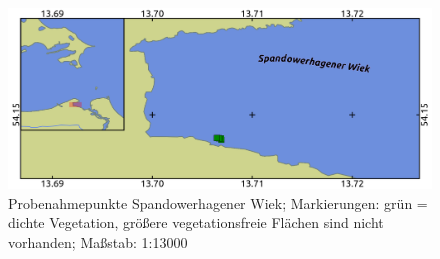 \begin{figure}[htb]
\centering
\includegraphics[width=1\textwidth]{images/SW.png}
\caption[Probenahmepunkte Spandowerhagener Wiek]{Probenahmepunkte Spandowerhagener Wiek; Markierungen: grün = dichte Vegetation, größere vegetationsfreie Flächen sind nicht vorhanden; Maßstab: 1:13000}
\label{SW}
\end{figure}



